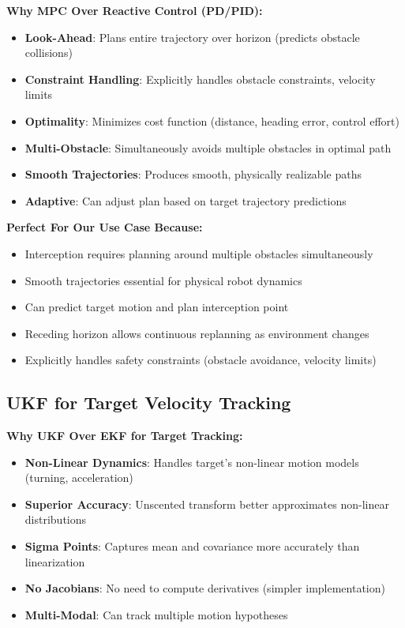 \documentclass[11pt]{article}
\begin{document}
\textbf{Why MPC Over Reactive Control (PD/PID):}

\begin{itemize}
    \item \textbf{Look-Ahead}: Plans entire trajectory over horizon (predicts obstacle collisions)
    \item \textbf{Constraint Handling}: Explicitly handles obstacle constraints, velocity limits
    \item \textbf{Optimality}: Minimizes cost function (distance, heading error, control effort)
    \item \textbf{Multi-Obstacle}: Simultaneously avoids multiple obstacles in optimal path
    \item \textbf{Smooth Trajectories}: Produces smooth, physically realizable paths
    \item \textbf{Adaptive}: Can adjust plan based on target trajectory predictions
\end{itemize}

\textbf{Perfect For Our Use Case Because:}
\begin{itemize}
    \item Interception requires planning around multiple obstacles simultaneously
    \item Smooth trajectories essential for physical robot dynamics
    \item Can predict target motion and plan interception point
    \item Receding horizon allows continuous replanning as environment changes
    \item Explicitly handles safety constraints (obstacle avoidance, velocity limits)
\end{itemize}

\subsection{UKF for Target Velocity Tracking}

\textbf{Why UKF Over EKF for Target Tracking:}

\begin{itemize}
    \item \textbf{Non-Linear Dynamics}: Handles target's non-linear motion models (turning, acceleration)
    \item \textbf{Superior Accuracy}: Unscented transform better approximates non-linear distributions
    \item \textbf{Sigma Points}: Captures mean and covariance more accurately than linearization
    \item \textbf{No Jacobians}: No need to compute derivatives (simpler implementation)
    \item \textbf{Multi-Modal}: Can track multiple motion hypotheses
\end{itemize}
\end{document}
